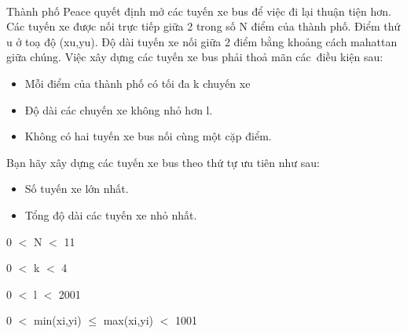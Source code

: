  

Thành phố Peace quyết định mở các tuyến xe bus để việc đi lại thuận tiện hơn. Các tuyến xe được nối trực tiếp giữa 2 trong số N điểm của thành phố. Điểm thứ u ở toạ độ (xu,yu). Độ dài tuyến xe nối giữa 2 điểm bằng khoảng cách mahattan giữa chúng. Việc xây dựng các tuyến xe bus phải thoả mãn các điều kiện sau:
\begin{itemize}
	\item Mỗi điểm của thành phố có tối đa k chuyến xe
	\item Độ dài các chuyến xe không nhỏ hơn l.
	\item Không có hai tuyến xe bus nối cùng một cặp điểm.
\end{itemize}

Bạn hãy xây dựng các tuyến xe bus theo thứ tự ưu tiên như sau:
\begin{itemize}
	\item Số tuyến xe lớn nhất.
	\item Tổng độ dài các tuyến xe nhỏ nhất.
\end{itemize}

0 $<$ N $<$ 11

0 $<$ k $<$ 4

0 $<$ l $<$ 2001

0 $<$ min(xi,yi)  $\le$  max(xi,yi) $<$ 1001